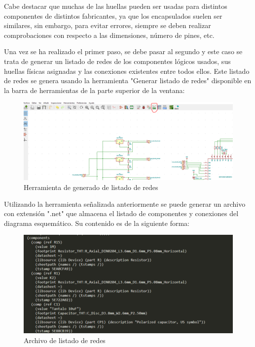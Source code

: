 Cabe destacar que muchas de las huellas pueden ser usadas para distintos componentes de distintos fabricantes, ya que los encapsulados suelen ser similares, sin embargo, para evitar errores, siempre se deben realizar comprobaciones con respecto a las dimensiones, número de pines, etc.

Una vez se ha realizado el primer paso, se debe pasar al segundo y este caso se trata de generar un listado de redes de los componentes lógicos usados, sus huellas físicas asignadas y las conexiones existentes entre todos ellos. Este listado de redes se genera usando la herramienta "Generar listado de redes" disponible en la barra de herramientas de la parte superior de la ventana:

\begin{figure}[H]
\centering 
\includegraphics[width=0.9\linewidth]{pictures/GenerarRed.PNG}
\caption{Herramienta de generado de listado de redes}
\label{fig:kdiagram}
\end{figure}

Utilizando la herramienta señalizada anteriormente se puede generar un archivo con extensión ".net" que almacena el listado de componentes y conexiones del diagrama esquemático. Su contenido es de la siguiente forma:

\begin{figure}[H]
\centering 
\includegraphics[width=0.9\linewidth]{pictures/net.PNG}
\caption{Archivo de listado de redes}
\label{fig:kdiagram}
\end{figure}

